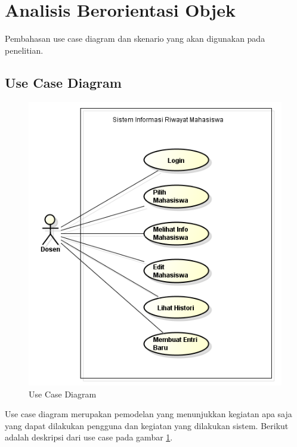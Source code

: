 \section{Analisis Berorientasi Objek}
\label{sec:analisisberorientasiobjek}

Pembahasan use case diagram dan skenario yang akan digunakan pada penelitian.

\subsection{Use Case Diagram}
\begin{figure}[H]
\centering
\includegraphics[scale=1]{Gambar/usecase.png}
\caption[Use Case Diagram]{Use Case Diagram} 
\label{fig:usecase}
\end{figure}

Use case diagram merupakan pemodelan yang menunjukkan kegiatan apa saja yang dapat dilakukan pengguna dan kegiatan yang dilakukan sistem. Berikut adalah deskripsi dari use case pada gambar \ref{fig:usecase}.

